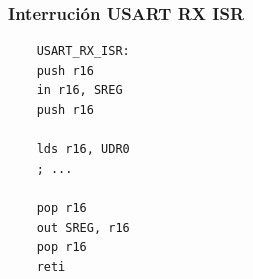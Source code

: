     
    \subsubsection{Interrución USART RX ISR}
    \begin{verbatim}
    USART_RX_ISR:
    push r16 
    in r16, SREG
    push r16

    lds r16, UDR0 
    ; ...

    pop r16
    out SREG, r16
    pop r16
    reti
    \end{verbatim}